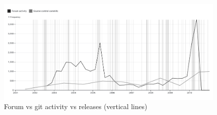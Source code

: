 \begin{figure}[h!] 
    \centering 
    \includegraphics[width=1\textwidth]{images/figure-forum-git-activity.png} 

    \caption{Forum vs git activity vs releases (vertical lines)}
    \label{figure:forum-git-activity}  
  \end{figure}